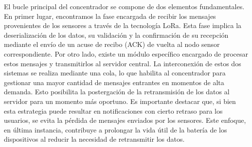 El bucle principal del concentrador se compone de dos elementos fundamentales. En primer lugar, encontramos la fase encargada de recibir los mensajes provenientes de los sensores a través de la tecnología LoRa. Esta fase implica la deserialización de los datos, su validación y la confirmación de su recepción mediante el envío de un acuse de recibo (ACK) de vuelta al nodo sensor correspondiente. Por otro lado, existe un módulo específico encargado de procesar estos mensajes y transmitirlos al servidor central.
La interconexión de estos dos sistemas se realiza mediante una cola, lo que habilita al concentrador para gestionar una mayor cantidad de mensajes entrantes en momentos de alta demanda. Esto posibilita la postergación de la retransmisión de los datos al servidor para un momento más oportuno. Es importante destacar que, si bien esta estrategia puede resultar en notificaciones con cierto retraso para los usuarios, se evita la pérdida de mensajes enviados por los sensores. Este enfoque, en última instancia, contribuye a prolongar la vida útil de la batería de los dispositivos al reducir la necesidad de retransmitir los datos. 


